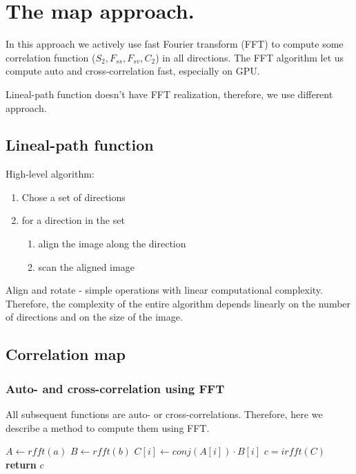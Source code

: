 \documentclass[reprint,amsmath,amssymb,aps,pre]{revtex4-1}
\begin{document}
\section{The map approach.}
\label{mapsec}

In this approach we actively use fast Fourier transform (FFT)
to compute some correlation function ($S_2, F_{ss}, F_{sv}, C_2$)
in all directions.
The FFT algorithm let us compute auto and cross-correlation fast,
especially on GPU.

Lineal-path function doesn't have FFT realization,
therefore, we use different approach.

\subsection{Lineal-path function}

High-level algorithm:
\begin{enumerate}
  \item Chose a set of directions
  \item for a direction in the set
    \begin{enumerate}
      \item align the image along the direction
      \item scan the aligned image
    \end{enumerate}
\end{enumerate}

Align and rotate - simple operations with linear computational complexity.
Therefore, the complexity of the entire algorithm depends linearly 
on the number of directions and on the size of the image.

\subsection{Correlation map}

\subsubsection{Auto- and cross-correlation using FFT}

All subsequent functions are auto- or cross-correlations.
Therefore, here we describe a method to compute them using FFT.

\begin{algorithmic}[1]
    \State $A \gets rfft(a)$
    \State $B \gets rfft(b)$
      \State $C[i] \gets conj(A[i]) \cdot B[i]$
    \EndFor
    \State $c = irfft(C)$ 
    \State \textbf{return} $c$
  \EndProcedure
\end{algorithmic}
\end{document}
